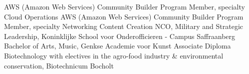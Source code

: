 %
%
%


\begin{scholarship}
					{AWS (Amazon Web Services) Community Builder Program Member, specialty Cloud Operations}
					{AWS (Amazon Web Services) Community Builder Program Member, specialty Networking Content Creation}
					{NCO, Military and Strategic Leadership, Koninklijke School voor Onderofficieren - Campus Saffraanberg}
					{Bachelor of Arts, Music, Genkse Academie voor Kunst}
					{Associate Diploma Biotechnology with electives in the agro-food industry \& environmental conservation, Biotechnicum Bocholt}
\end{scholarship}